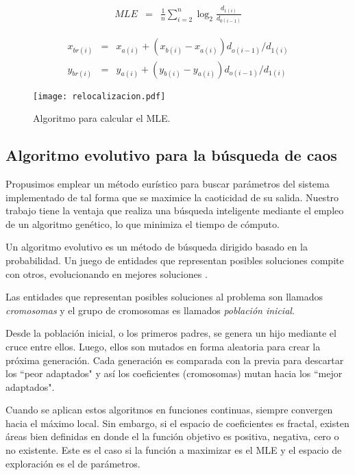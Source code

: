 \begin{eqnarray}\label{eq:Lyapunov}
MLE &=& \frac{1}{n} \sum_{i=2}^{n} \log_2{\frac{d_{1(i)}}{d_{0(i-1)}}}
\end{eqnarray}

\begin{eqnarray}\label{eq:reubicacion}
x_{br(i)}&=& x_{a(i)}+(x_{b(i)}-x_{a(i)})d_{o(i-1)}/d_{1(i)} \nonumber\\
y_{br(i)}&=& y_{a(i)}+(y_{b(i)}-y_{a(i)})d_{o(i-1)}/d_{1(i)}
\end{eqnarray}

\begin{figure}
	\centering
	\texttt{[image: relocalizacion.pdf]}\\
	\caption{Algoritmo para calcular el MLE.}\label{fig:relocalizacion}
\end{figure}

\subsection{Algoritmo evolutivo para la búsqueda de caos}

Propusimos emplear un método eurístico para buscar parámetros del sistema implementado de tal forma que se maximice la caoticidad de su salida.
Nuestro trabajo tiene la ventaja que realiza una búsqueda inteligente mediante el empleo de un algoritmo genético, lo que minimiza el tiempo de cómputo.

Un algoritmo evolutivo es un método de búsqueda dirigido basado en la probabilidad.
Un juego de entidades que representan posibles soluciones compite con otros, evolucionando en mejores soluciones \cite{Weise2009}.

Las entidades que representan posibles soluciones al problema son llamados \textit{cromosomas} y el grupo de cromosomas es llamados \textit{población inicial}.

Desde la población inicial, o los primeros padres, se genera un hijo mediante el cruce entre ellos.
Luego, ellos son mutados en forma aleatoria para crear la próxima generación.
Cada generación es comparada con la previa para descartar los ``peor adaptados" y así los coeficientes (cromosomas) mutan hacia los ``mejor adaptados".

Cuando se aplican estos algoritmos en funciones continuas, siempre convergen hacia el máximo local.
Sin embargo, si el espacio de coeficientes es fractal, existen áreas bien definidas en donde el la función objetivo es positiva, negativa, cero o no existente.
Este es el caso si la función a maximizar es el MLE y el espacio de exploración es el de parámetros.

